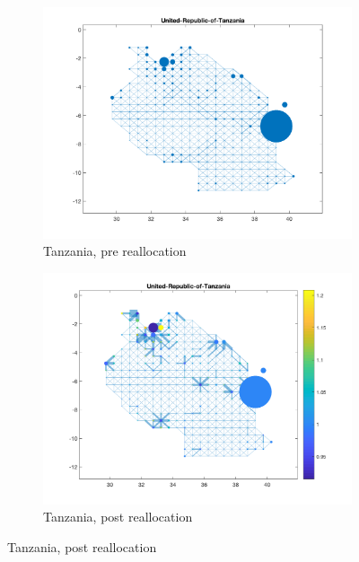 \documentclass[11pt, oneside]{article}   	%
\begin{document}
{\begin{figure}[]
\begin{subfigure}[c]{0.45\textwidth}
\includegraphics[width=\textwidth, trim={2cm 1cm 1.5cm 0cm},clip]{../../Build/output/Matlab_graphs/Nicer_graphs/United-Republic-of-Tanzania_stat.png}
\caption{Tanzania, pre reallocation}
\label{fig:tanzania_pre}
\end{subfigure}
\begin{subfigure}[c]{0.45\textwidth}
\includegraphics[width=\textwidth, trim={2cm 1cm 1.5cm 0cm},clip]{../../Build/output/Matlab_graphs/Nicer_graphs/United-Republic-of-Tanzania_opt.png}
\caption{Tanzania, post reallocation}
\label{fig:tanzania_post}
\end{subfigure}


\end{figure}}
\end{document}
